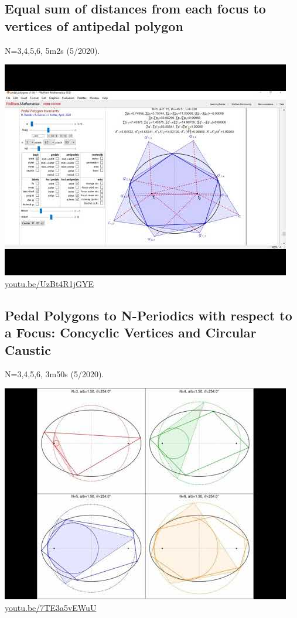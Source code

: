 \documentclass[12pt]{amsart}
\begin{document}
\subsection{Equal sum of distances from each focus to vertices of antipedal polygon}
\label{vid:UzBt4R1jGYE}
\noindent N=3,4,5,6, 5m2s (5/2020). 
\begin{center}\includegraphics[width=.5\textwidth]{pics/UzBt4R1jGYE.jpg} \\ 
\href{https://youtu.be/UzBt4R1jGYE}{\url{youtu.be/UzBt4R1jGYE}}\end{center}
% 

\subsection{Pedal Polygons to N-Periodics with respect to a Focus: Concyclic Vertices and Circular Caustic}
\label{vid:7TE3a5vEWuU}
\noindent N=3,4,5,6, 3m50s (5/2020). 
\begin{center}\includegraphics[width=.5\textwidth]{pics/7TE3a5vEWuU.jpg} \\ 
\href{https://youtu.be/7TE3a5vEWuU}{\url{youtu.be/7TE3a5vEWuU}}\end{center}
% 
\end{document}
